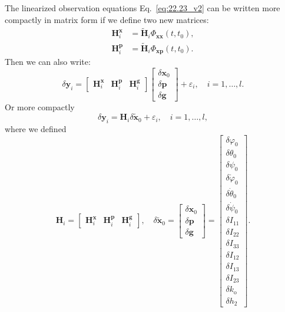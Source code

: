 \documentclass[pdflatex,sn-mathphys-num]{sn-jnl}%
\theoremstyle{thmstyleone}%
\theoremstyle{thmstyletwo}%
\theoremstyle{thmstylethree}%
\renewcommand{\vec}[1]{\boldsymbol{#1}}
\begin{document}
	The linearized observation equations Eq.~\eqref{eq:22.23_v2} can be written more compactly in matrix form if we define two new matrices:
	\begin{align}
		\vec{H}_{i}^{\vec{x}} &= \tilde{\vec{H}}_i \Phi_{\vec{xx}}(t, t_0), \\
		\vec{H}_{i}^{\vec{p}}  &= \tilde{\vec{H}}_i \Phi_{\vec{xp}}(t, t_0). 
	\end{align}
	Then we can also write:
	\begin{equation}
		\delta\vec{y}_i = 
		\begin{bmatrix}
			\vec{H}_{i}^{\vec{x}}  & 	\vec{H}_{i}^{\vec{p}} & \vec{H}^{\vec{g}}_i 
		\end{bmatrix}
		\begin{bmatrix}
			\delta\vec{x}_0 \\ \delta\vec{p} \\ \delta\vec{g} 
		\end{bmatrix}
		+ \varepsilon_i, \quad  i = 1, \ldots, l .
	\end{equation}
	Or more compactly
	\begin{equation}
		\delta\vec{y}_i = 	\vec{H}_{i} \delta\tilde{	\vec{x}}_0 	+ \varepsilon_i, \quad  i = 1, \ldots,l,
	\end{equation}
	where we defined
	\begin{equation}
		\label{eq:def:HMat}
		\vec{H}_{i} = 
		\begin{bmatrix}
			\vec{H}_{i}^{\vec{x}}  & 	\vec{H}_{i}^{\vec{p}} & \vec{H}^{\vec{g}}_i 
		\end{bmatrix}, \quad 
		\delta\tilde{	\vec{x}}_0 =
		\begin{bmatrix}
			\delta\vec{x}_0 \\ \delta\vec{p} \\ \delta\vec{g} 
		\end{bmatrix}
		=
		\begin{bmatrix}
			\delta \varphi_0 \\
			\delta\theta_0 \\
			\delta \psi_0 \\
			\delta \dot{\varphi}_0 \\
			\delta \dot{\theta}_0\\
			\delta \dot{\psi}_0\\
			\delta I_{11} \\ \delta I_{22} \\ \delta I_{33} \\
			\delta I_{12} \\ \delta I_{13} \\ \delta I_{23} \\ 
			\delta k_\mathrm{o} \\
			\delta h_2
		\end{bmatrix}.
	\end{equation}
	
\end{document}
